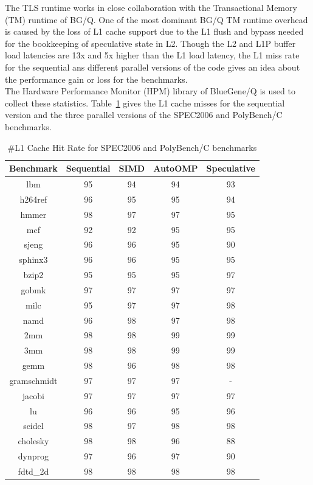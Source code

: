 \documentclass[10pt]{report}          %
\begin{document}
The TLS runtime works in close collaboration with the Transactional Memory (TM) runtime of BG/Q.  One of the most dominant BG/Q TM runtime overhead is caused by the loss of L1 cache support due to the L1 flush and bypass needed for the bookkeeping of speculative
state in L2. Though the L2 and L1P buffer load latencies are 13x and 5x higher than the L1 load latency, the L1 miss rate for the sequential ans different parallel versions of the code gives an idea about the performance gain or loss for the benchmarks.\\

The Hardware Performance Monitor (HPM) library of BlueGene/Q is used to collect these statistics. Table~\ref{table:cache} gives the L1 cache misses for the sequential version and the three parallel versions of the SPEC2006 and PolyBench/C benchmarks.\\

\begin{table}[h]
\centering
\caption{\#L1 Cache Hit Rate for SPEC2006 and PolyBench/C benchmarks}
\begin{tabular}{|c||c|c|c|c|} \hline
Benchmark &Sequential & SIMD & AutoOMP & Speculative\\ \hline 
lbm & 95 & 94 & 94 & 93\\ \hline
h264ref & 96 & 95 & 95 & 94 \\ \hline
hmmer &	98 & 97 & 97 & 95  \\ \hline
mcf & 92 & 92 & 95 & 95 \\ \hline
sjeng &	96 & 96 & 95 & 90 \\ \hline
sphinx3 & 96 & 96 & 95 & 95  \\ \hline
bzip2 & 95 & 95 & 95 & 97  \\ \hline
gobmk & 97 & 97 & 97 & 97  \\ \hline
milc & 95 & 97 & 97 & 98  \\ \hline
namd & 96 & 98 & 97 & 98  \\ \hline
2mm	& 98 & 98 & 99 & 99 \\ \hline
3mm	& 98 & 98 & 99 & 99 \\ \hline
gemm	 & 98 & 96 & 98 & 98\\ \hline
gramschmidt	& 97 & 97 & 97 & - \\ \hline
jacobi & 97& 97 & 97 & 97 \\ \hline
lu	& 96 & 96 & 95 & 96 \\ \hline
seidel&	98 & 97 & 98 & 98 \\ \hline
cholesky & 98 & 98 & 96 & 88\\ \hline
dynprog & 97 & 96 & 97 & 90\\ \hline
fdtd\_2d & 98 & 98 & 98 & 98 \\ \hline
\hline\end{tabular}
\label{table:cache}
\end{table}
\end{document}
